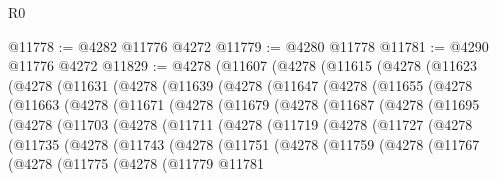 \begin{lexlean}{R0}
\begin{coremodule}
@11778 := @4282 @11776 @4272
@11779 := @4280 @11778
@11781 := @4290 @11776 @4272
@11829 := @4278
    (@11607
      (@4278
        (@11615
          (@4278
            (@11623
              (@4278
                (@11631
                  (@4278
                    (@11639
                      (@4278
                        (@11647
                          (@4278
                            (@11655
                              (@4278
                                (@11663
                                  (@4278
                                    (@11671
                                      (@4278
                                        (@11679
                                          (@4278
                                            (@11687
                                              (@4278
                                                (@11695
                                                  (@4278
                                                    (@11703
                                                      (@4278
                                                        (@11711
                                                          (@4278
                                                            (@11719
                                                              (@4278
                                                                (@11727
                                                                  (@4278
                                                                    (@11735
                                                                      (@4278
                                                                        (@11743
                                                                          (@4278
                                                                            (@11751
                                                                              (@4278
                                                                                (@11759
                                                                                  (@4278
                                                                                    (@11767
                                                                                      (@4278
                                                                                        (@11775
                                                                                          (@4278
                                                                                            (@11779
                                                                                              @11781

\end{coremodule}
\end{lexlean}
